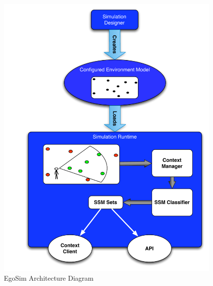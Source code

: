 \begin{figure}[H]
	\centering
	\includegraphics[width=\linewidth]{gfx/Chapter3/initial_architecture}
	\caption{EgoSim Architecture Diagram}
	\label{fig:initial_architecture}
\end{figure}


